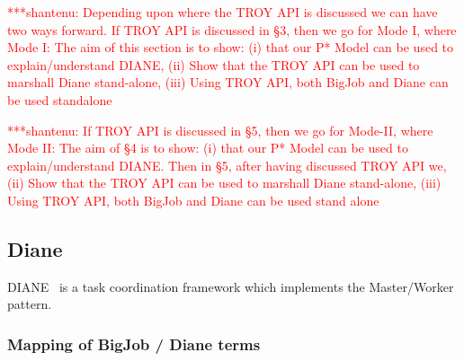 \documentclass[conference,final]{IEEEtran}
\newcommand{\jhanote}[1]{ {\textcolor{red} { ***shantenu: #1 }}}
\newcommand{\jhanote}[1]{}
\begin{document}
\jhanote{Depending upon where the TROY API is discussed we can have
  two ways forward. If TROY API is discussed in \S 3, then we go for
  Mode I, where Mode I: The aim of this section is to show: (i) that
  our P* Model can be used to explain/understand DIANE, (ii) Show that
  the TROY API can be used to marshall Diane stand-alone, (iii) Using
  TROY API, both BigJob and Diane can be used standalone}

\jhanote{If TROY API is discussed in \S 5, then we go for Mode-II,
  where Mode II: The aim of \S 4 is to show: (i) that our P* Model can
  be used to explain/understand DIANE.  Then in \S 5, after having
  discussed TROY API we, (ii) Show that the TROY API can be used to
  marshall Diane stand-alone, (iii) Using TROY API, both BigJob and
  Diane can be used stand alone}


\subsection{Diane}

DIANE~\cite{Moscicki:908910} is a task coordination framework which implements 
the Master/Worker pattern. 

\subsubsection{Mapping of BigJob / Diane terms}
\end{document}
